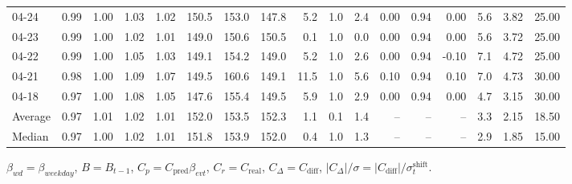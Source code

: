 \begin{threeparttable}
{\begin{tabular}{lrrrrrrrrrrrrrrrr}
  04-24 &         0.99 &           1.00 &          1.03 &          1.02 & 150.5 & 153.0 & 147.8 &        5.2 &                      1.0 &                 2.4 &       0.00 &      0.94 &           0.00 &              5.6 &            3.82 &                  25.00 \\
  04-23 &         0.99 &           1.00 &          1.02 &          1.01 & 149.0 & 150.6 & 150.5 &        0.1 &                      1.0 &                 0.0 &       0.00 &      0.94 &           0.00 &              5.6 &            3.72 &                  25.00 \\
  04-22 &         0.99 &           1.00 &          1.05 &          1.03 & 149.1 & 154.2 & 149.0 &        5.2 &                      1.0 &                 2.6 &       0.00 &      0.94 &          -0.10 &              7.1 &            4.72 &                  25.00 \\
  04-21 &         0.98 &           1.00 &          1.09 &          1.07 & 149.5 & 160.6 & 149.1 &       11.5 &                      1.0 &                 5.6 &       0.10 &      0.94 &           0.10 &              7.0 &            4.73 &                  30.00 \\
  04-18 &         0.97 &           1.00 &          1.08 &          1.05 & 147.6 & 155.4 & 149.5 &        5.9 &                      1.0 &                 2.9 &       0.00 &      0.94 &           0.00 &              4.7 &            3.15 &                  30.00 \\
Average &         0.97 &           1.01 &          1.02 &          1.01 & 152.0 & 153.5 & 152.3 &        1.1 &                      0.1 &                 1.4 &         -- &        -- &             -- &              3.3 &            2.15 &                  18.50 \\
 Median &         0.97 &           1.00 &          1.02 &          1.01 & 151.8 & 153.9 & 152.0 &        0.4 &                      1.0 &                 1.3 &         -- &        -- &             -- &              2.9 &            1.85 &                  15.00 \\
\bottomrule
\end{tabular}
}
\begin{tablenotes}\footnotesize
\item $\beta_{wd}=\beta_{weekday}$, $B=B_{t-1}$,
$C_p=C_{\text{pred}}\beta_{evt}$, $C_r=C_{\text{real}}$,
$C_\Delta=C_{\text{diff}}$, $|C_\Delta|/\sigma=|C_{\text{diff}}|/\sigma_t^{\text{shift}}$.
\end{tablenotes}
\end{threeparttable}
\endgroup
